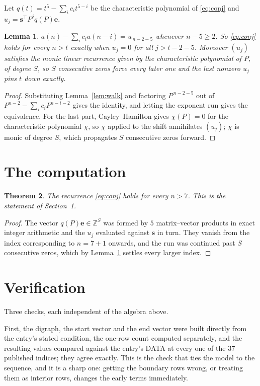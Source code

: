 \documentclass[11pt,a4paper]{article}
\theoremstyle{plain}
\newtheorem{theorem}{Theorem}
\newtheorem{lemma}[theorem]{Lemma}
\theoremstyle{definition}
\begin{document}
Let $q(t)=t^{5}-\sum_i c_i t^{5-i}$ be the characteristic polynomial of
\eqref{eq:conj} and $u_j=\mathbf{s}^{\!\top}P^{j}q(P)\mathbf{e}$.

\begin{lemma}\label{lem:crit}
$a(n)-\sum_i c_i a(n-i)=u_{\,n-2-5}$ whenever $n-5\ge2$. So \eqref{eq:conj}
holds for every $n>t$ exactly when $u_j=0$ for all $j>t-2-5$. Moreover $(u_j)$
satisfies the monic linear recurrence given by the characteristic polynomial of $P$, of
degree $S$, so $S$ consecutive zeros force every later one and the last nonzero $u_j$ pins
$t$ down exactly.
\end{lemma}

\begin{proof}
Substituting Lemma~\ref{lem:walk} and factoring $P^{\,n-2-5}$ out of
$P^{n-2}-\sum_i c_i P^{n-i-2}$ gives the identity, and letting the exponent run gives the
equivalence. For the last part, Cayley--Hamilton gives $\chi(P)=0$ for the characteristic
polynomial $\chi$, so $\chi$ applied to the shift annihilates $(u_j)$; $\chi$ is monic of
degree $S$, which propagates $S$ consecutive zeros forward.
\end{proof}

\section{The computation}

\begin{theorem}
The recurrence \eqref{eq:conj} holds for every $n>7$. This is the statement of
Section~1.
\end{theorem}

\begin{proof}
The vector $q(P)\mathbf{e}\in\mathbb{Z}^{S}$ was formed by $5$ matrix--vector
products in exact integer arithmetic and the $u_j$ evaluated against $\mathbf{s}$ in turn.
They vanish from the index corresponding to $n=7+1$ onwards, and the run was continued
past $S$ consecutive zeros, which by Lemma~\ref{lem:crit} settles every larger index.
\end{proof}

\section{Verification}

Three checks, each independent of the algebra above.

First, the digraph, the start vector and the end vector were built directly from the
entry's stated condition, the one-row count computed separately, and the resulting values
compared against the entry's DATA at every one of the $37$ published indices; they
agree exactly. This is the check that ties the model to the sequence, and it is a sharp one:
getting the boundary rows wrong, or treating them as interior rows, changes the early terms
immediately.
\end{document}
